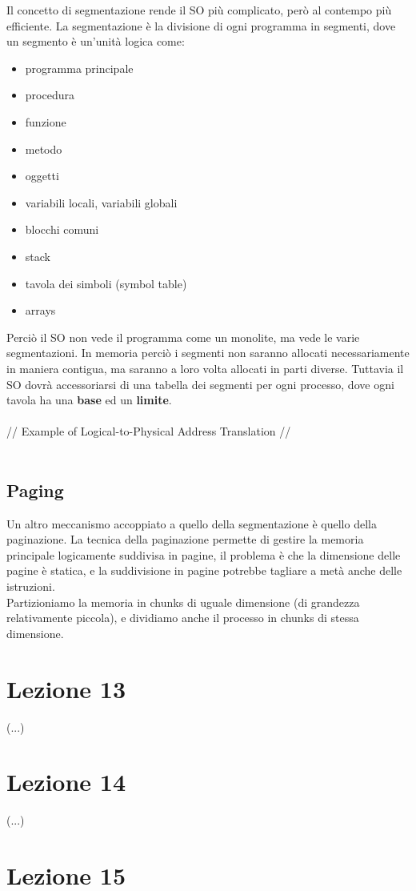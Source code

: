 \documentclass[12pt, a4paper]{article}
\begin{document}
	Il concetto di segmentazione rende il SO più complicato, però al contempo più efficiente. La segmentazione è la divisione di ogni programma in segmenti, dove un segmento è un'unità logica come:
	\begin{itemize}
		\item programma principale
		\item procedura
		\item funzione
		\item metodo
		\item oggetti
		\item variabili locali, variabili globali
		\item blocchi comuni
		\item stack
		\item tavola dei simboli (symbol table)
		\item arrays
	\end{itemize}
	Perciò il SO non vede il programma come un monolite, ma vede le varie segmentazioni. In memoria perciò i segmenti non saranno allocati necessariamente in maniera contigua, ma saranno a loro volta allocati in parti diverse. Tuttavia il SO dovrà accessoriarsi di una tabella dei segmenti per ogni processo, dove ogni tavola ha una \textbf{base} ed un \textbf{limite}. \\\\
	// Example of Logical-to-Physical Address Translation // \\ \\
	
	
	\subsection*{Paging}
	
	Un altro meccanismo accoppiato a quello della segmentazione è quello della paginazione. La tecnica della paginazione permette di gestire la memoria principale logicamente suddivisa in pagine, il problema è che la dimensione delle pagine è statica, e la suddivisione in pagine potrebbe tagliare a metà anche delle istruzioni. \\
	Partizioniamo la memoria in chunks di uguale dimensione (di grandezza relativamente piccola), e dividiamo anche il processo in chunks di stessa dimensione.
	
	
	
	\section*{Lezione 13}
	(...)
	
	
	
	\section*{Lezione 14}
	(...)
	
	
	
	\section*{Lezione 15}
	
	
	
	
\end{document}
